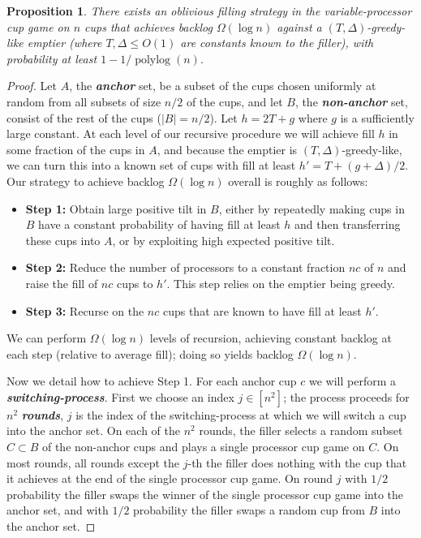 \documentclass[twocolumn]{article}[10pt]
\newcommand{\defn}[1]{{\textit{\textbf{\boldmath #1}}}\xspace}
\DeclareMathOperator{\polylog}{\text{polylog}}
\newtheorem{proposition}{Proposition}
\begin{document}
\begin{proposition}
  \label{prop:obliviousBase}
  There exists an oblivious filling strategy in the variable-processor cup game
  on $n$ cups that achieves backlog $\Omega(\log n)$ against a $(T,
  \Delta)$-greedy-like emptier (where $T, \Delta \le O(1)$ are constants
  known to the filler), with probability at least $1-1/\polylog(n)$.
\end{proposition}
\begin{proof}
  Let $A$, the \defn{anchor} set, be a subset of the cups chosen uniformly at
  random from all subsets of size $n/2$ of the cups, and let $B$, the
  \defn{non-anchor} set, consist of the rest of the cups ($|B| = n/2$). 
  Let $h = 2 T + g $ where $g$ is a sufficiently large constant. At each
  level of our recursive procedure we will achieve fill $h$ in some fraction of
  the cups in $A$, and because the emptier is $(T, \Delta)$-greedy-like, we can turn this into a
  known set of cups with fill at least $h' = T + (g+\Delta)/2$.
  Our strategy to achieve backlog $\Omega(\log n)$ overall is roughly as follows:
  \begin{itemize}
    \item \textbf{Step 1:} 
      Obtain large positive tilt in $B$, either by repeatedly making cups in
      $B$ have a constant probability of having fill at least $h$ and then
      transferring these cups into $A$, or by exploiting high expected positive tilt.
  \item \textbf{Step 2:} Reduce the number of processors to a constant fraction $nc$ of $n$ and
    raise the fill of $nc$ cups to $h'$. This step relies on the emptier being
    greedy.
  \item \textbf{Step 3:} Recurse on the $nc$ cups that are known to have fill at least $h'$.
\end{itemize}
We can perform $\Omega(\log n)$ levels of recursion, achieving constant backlog
at each step (relative to average fill); doing so yields backlog $\Omega(\log
n)$.

Now we detail how to achieve Step 1.
For each anchor cup $c$ we will perform a \defn{switching-process}.
First we choose an index $j \in [n^2]$; the process proceeds for $n^2$
\defn{rounds}, $j$ is the index of the switching-process at which we will
switch a cup into the anchor set.
On each of the $n^2$ rounds, the filler selects a random subset $C\subset B$ of
the non-anchor cups and plays a single processor cup game on $C$.
On most rounds, all rounds except the $j$-th the filler does nothing with the
cup that it achieves at the end of the single processor cup game.
On round $j$ with $1/2$ probability the filler swaps the winner of the single processor
cup game into the anchor set, and with $1/2$ probability the filler swaps a random cup
from $B$ into the anchor set.


\end{proof}
\end{document}
